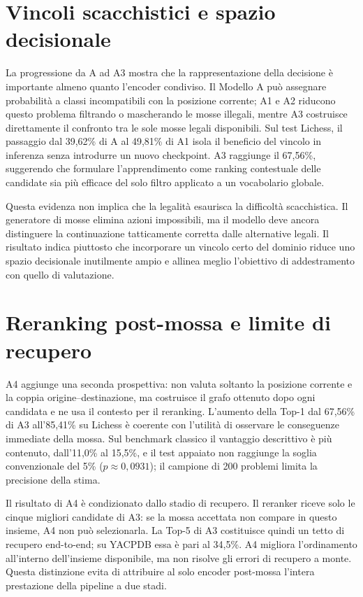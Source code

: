 \label{chap:discussion}

\section{Vincoli scacchistici e spazio decisionale}

La progressione da A ad A3 mostra che la rappresentazione della decisione è
importante almeno quanto l'encoder condiviso. Il Modello A può assegnare probabilità
a classi incompatibili con la posizione corrente; A1 e A2 riducono questo problema
filtrando o mascherando le mosse illegali, mentre A3 costruisce direttamente il
confronto tra le sole mosse legali disponibili. Sul test Lichess, il passaggio dal
39,62\% di A al 49,81\% di A1 isola il beneficio del vincolo in inferenza senza
introdurre un nuovo checkpoint. A3 raggiunge il 67,56\%, suggerendo che formulare
l'apprendimento come ranking contestuale delle candidate sia più efficace del solo
filtro applicato a un vocabolario globale.

Questa evidenza non implica che la legalità esaurisca la difficoltà scacchistica.
Il generatore di mosse elimina azioni impossibili, ma il modello deve ancora
distinguere la continuazione tatticamente corretta dalle alternative legali. Il
risultato indica piuttosto che incorporare un vincolo certo del dominio riduce uno
spazio decisionale inutilmente ampio e allinea meglio l'obiettivo di addestramento
con quello di valutazione.

\section{Reranking post-mossa e limite di recupero}

A4 aggiunge una seconda prospettiva: non valuta soltanto la posizione corrente e
la coppia origine--destinazione, ma costruisce il grafo ottenuto dopo ogni candidata
e ne usa il contesto per il reranking. L'aumento della Top-1 dal 67,56\% di A3
all'85,41\% su Lichess è coerente con l'utilità di osservare le conseguenze
immediate della mossa. Sul benchmark classico il vantaggio descrittivo è più
contenuto, dall'11,0\% al 15,5\%, e il test appaiato non raggiunge la soglia
convenzionale del 5\% (\(p\approx0{,}0931\)); il campione di 200 problemi limita la
precisione della stima.

Il risultato di A4 è condizionato dallo stadio di recupero. Il reranker riceve solo
le cinque migliori candidate di A3: se la mossa accettata non compare in questo
insieme, A4 non può selezionarla. La Top-5 di A3 costituisce quindi un tetto di
recupero end-to-end; su YACPDB essa è pari al 34,5\%. A4 migliora l'ordinamento
all'interno dell'insieme disponibile, ma non risolve gli errori di recupero a monte.
Questa distinzione evita di attribuire al solo encoder post-mossa l'intera
prestazione della pipeline a due stadi.

